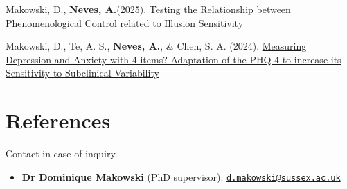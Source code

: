 \documentclass[11pt,a4paper,]{awesome-cv}
\providecommand{\tightlist}{%
	\setlength{\itemsep}{0pt}\setlength{\parskip}{0pt}}
\begin{document}
\small

Makowski, D., \textbf{Neves, A.}(2025).
\href{https://doi.org/10.31234/osf.io/873th_v3}{Testing the Relationship
between Phenomenological Control related to Illusion Sensitivity}

Makowski, D., Te, A. S., \textbf{Neves, A.}, \& Chen, S. A. (2024).
\href{https://doi.org/10.31234/osf.io/436np}{Measuring Depression and
Anxiety with 4 items? Adaptation of the PHQ-4 to increase its
Sensitivity to Subclinical Variability}

\normalsize

\section{References}\label{references}

\small

Contact in case of inquiry.

\begin{itemize}
\tightlist
\item
  \textbf{Dr Dominique Makowski} (PhD supervisor):
  \href{mailto:d.makowski@sussex.ac.uk}{\nolinkurl{d.makowski@sussex.ac.uk}}
\end{itemize}

\normalsize


\label{LastPage}~
\end{document}

